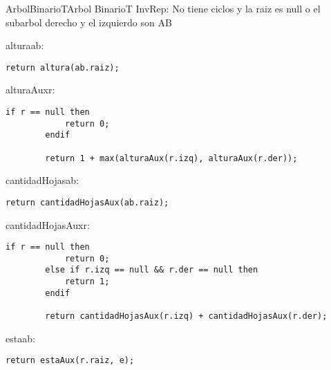 \begin{module}{ArbolBinario}{T}{Arbol Binario}{T}
	\medskip
	InvRep: No tiene ciclos y la raiz es null o el subarbol derecho y el izquierdo son AB



	\begin{proc}{altura}{\In ab: \moduletype}{\Int}
		\begin{lstlisting}[numbers=none,frame=none]
		return altura(ab.raiz);
		\end{lstlisting}
	\end{proc}

	\begin{proc}{alturaAux}{\In r: \nodo}{\Int}
		\begin{lstlisting}[numbers=none,frame=none]
		if r == null then
			return 0;
		endif
	
		return 1 + max(alturaAux(r.izq), alturaAux(r.der));
		\end{lstlisting}
	\end{proc}

	\begin{proc}{cantidadHojas}{\In ab: \moduletype}{\Int}
		\begin{lstlisting}[numbers=none,frame=none]
		return cantidadHojasAux(ab.raiz);
		\end{lstlisting}
	\end{proc}

	\begin{proc}{cantidadHojasAux}{\In r: \nodo}{\Int}
		\begin{lstlisting}[numbers=none,frame=none]
		if r == null then
			return 0;
		else if r.izq == null && r.der == null then
			return 1;
		endif

		return cantidadHojasAux(r.izq) + cantidadHojasAux(r.der);
		\end{lstlisting}
	\end{proc}

	\pagebreak

	\begin{proc}{esta}{\In ab: \moduletype}{\bool}
		\begin{lstlisting}[numbers=none,frame=none]
		return estaAux(r.raiz, e);
		\end{lstlisting}
	\end{proc}


\end{module}
